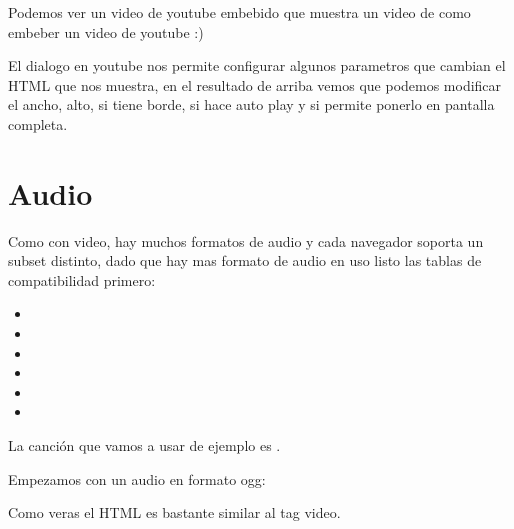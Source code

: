 \documentclass[letterpaper,10pt,spanish]{sphinxmanual}
\begin{document}
Podemos ver un video de youtube embebido que muestra un video de como embeber
un video de youtube :)

El dialogo en youtube nos permite configurar algunos parametros que cambian el
HTML que nos muestra, en el resultado de arriba vemos que podemos modificar el
ancho, alto, si tiene borde, si hace auto play y si permite ponerlo en pantalla
completa.


\section{Audio}
\label{\detokenize{audio-y-video:audio}}
Como con video, hay muchos formatos de audio y cada navegador soporta un subset
distinto, dado que hay mas formato de audio en uso listo las tablas de
compatibilidad primero:
\begin{itemize}
\item {} 

\item {} 

\item {} 

\item {} 

\item {} 

\item {} 

\end{itemize}

La canción que vamos a usar de ejemplo es .

Empezamos con un audio en formato ogg:

%
\begin{sphinxVerbatim}[commandchars=\\\{\}]
  
\end{sphinxVerbatim}



Como veras el HTML es bastante similar al tag video.
\end{document}
